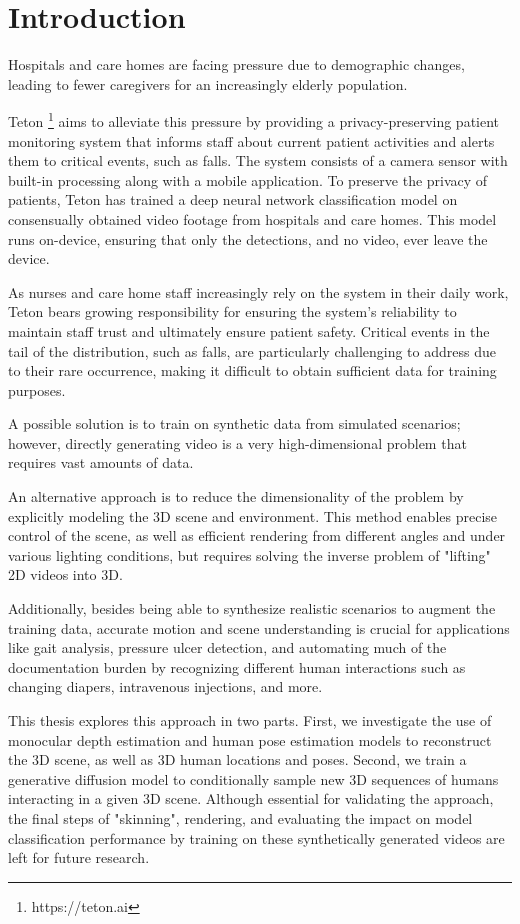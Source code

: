 \chapter{Introduction}
Hospitals and care homes are facing pressure due to demographic changes, leading to fewer caregivers for an increasingly elderly population.

Teton \footnote{https://teton.ai} aims to alleviate this pressure by providing a privacy-preserving patient monitoring system that informs staff about current patient activities and alerts them to critical events, such as falls. The system consists of a camera sensor with built-in processing along with a mobile application. To preserve the privacy of patients, Teton has trained a deep neural network classification model on consensually obtained video footage from hospitals and care homes. This model runs on-device, ensuring that only the detections, and no video, ever leave the device. 

As nurses and care home staff increasingly rely on the system in their daily work, Teton bears growing responsibility for ensuring the system's reliability to maintain staff trust and ultimately ensure patient safety. Critical events in the tail of the distribution, such as falls, are particularly challenging to address due to their rare occurrence, making it difficult to obtain sufficient data for training purposes. 

A possible solution is to train on synthetic data from simulated scenarios; however, directly generating video is a very high-dimensional problem that requires vast amounts of data.

An alternative approach is to reduce the dimensionality of the problem by explicitly modeling the 3D scene and environment. This method enables precise control of the scene, as well as efficient rendering from different angles and under various lighting conditions, but requires solving the inverse problem of "lifting" 2D videos into 3D.

Additionally, besides being able to synthesize realistic scenarios to augment the training data, accurate motion and scene understanding is crucial for applications like gait analysis, pressure ulcer detection, and automating much of the documentation burden by recognizing different human interactions such as changing diapers, intravenous injections, and more.

This thesis explores this approach in two parts. First, we investigate the use of monocular depth estimation and human pose estimation models to reconstruct the 3D scene, as well as 3D human locations and poses. Second, we train a generative diffusion model to conditionally sample new 3D sequences of humans interacting in a given 3D scene. Although essential for validating the approach, the final steps of "skinning", rendering, and evaluating the impact on model classification performance by training on these synthetically generated videos are left for future research.

